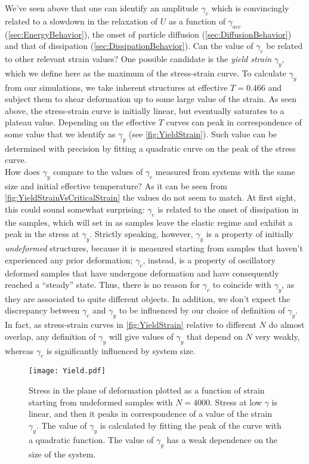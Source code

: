 We've seen above that one can identify an amplitude $\gamma_{c}$ which is convincingly related to a slowdown in the relaxation of $U$ as a function of $\gamma_{acc}$ (\autoref{sec:EnergyBehavior}), the onset of particle diffusion (\autoref{sec:DiffusionBehavior}) and that of dissipation (\autoref{sec:DissipationBehavior}). Can the value of $\gamma_{c}$ be related to other relevant strain values? One possible candidate is the \emph{yield strain} $\gamma_{y}$, which we define here as the maximum of the stress-strain curve. To calculate $\gamma_{y}$ from our simulations, we take inherent structures at effective $T=0.466$ and subject them to shear deformation up to some large value of the strain. As seen above, the stress-strain curve is initially linear, but eventually saturates to a plateau value. Depending on the effective $T$ curves can peak in correspondence of some value that we identify as $\gamma_{y}$ (see \autoref{fig:YieldStrain}). Such value can be determined with precision by fitting a quadratic curve on the peak of the stress curve.\\
How does $\gamma_{y}$ compare to the values of $\gamma_{c}$ measured from systems with the same size and initial effective temperature? As it can be seen from \autoref{fig:YieldStrainVsCriticalStrain} the values do not seem to match.
At first sight, this could sound somewhat surprising: $\gamma_{c}$ is related to the onset of dissipation in the samples, which will set in as samples leave the elastic regime and exhibit a peak in the stress at $\gamma_{y}$. Strictly speaking, however, $\gamma_{y}$ is a property of initially \emph{undeformed} structures, because it is measured starting from samples that haven't experienced any prior deformation; $\gamma_{c}$, instead, is a property of oscillatory deformed samples that have undergone deformation and have consequently reached a ``steady'' state. Thus, there is no reason for $\gamma_{c}$ to coincide with $\gamma_{y}$, as they are associated to quite different objects.
In addition, we don't expect the discrepancy between $\gamma_{c}$ and $\gamma_{y}$ to be influenced by our choice of definition of $\gamma_{y}$. In fact, as stress-strain curves in \autoref{fig:YieldStrain} relative to different $N$ do almost overlap, any definition of $\gamma_{y}$ will give values of $\gamma_{y}$ that depend on $N$ very weakly, whereas $\gamma_{c}$ is significantly influenced by system size.

\begin{figure}[!h] 
\centering 
\texttt{[image: Yield.pdf]} 
\caption{Stress in the plane of deformation plotted as a function of strain starting from undeformed samples with $N=4000$. Stress at low $\gamma$ is linear, and then it peaks in correspondence of a value of the strain $\gamma_{y}$. The value of $\gamma_{y}$ is calculated by fitting the peak of the curve with a quadratic function. The value of $\gamma_{y}$ has a weak dependence on the size of the system. \label{fig:YieldStrain}}
\end{figure}

